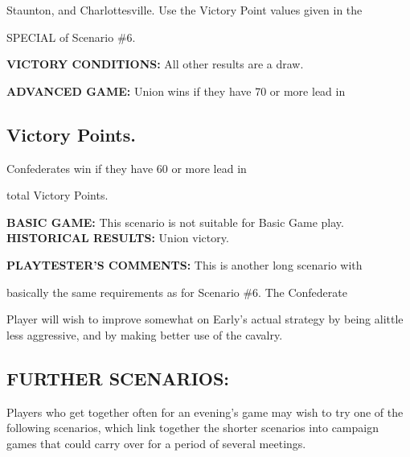 Staunton, and Charlottesville. Use the Victory Point values given in the

\begin{scenariodata}
SPECIAL of Scenario \#6.\\
\end{scenariodata}

\begin{scenariodata}
\textbf{VICTORY CONDITIONS:} All other results are a draw.\\
\end{scenariodata}

\begin{scenariodata}
\textbf{ADVANCED GAME:} Union wins if they have 70 or more lead in\\
\end{scenariodata}

\subsection*{Victory Points.}

\begin{scenariodata}
Confederates win if they have 60 or more lead in\\
\end{scenariodata}

total Victory Points.

\begin{scenariodata}
\textbf{BASIC GAME:} This scenario is not suitable for Basic Game play.\\
\textbf{HISTORICAL RESULTS:} Union victory.\\
\end{scenariodata}

\begin{scenariodata}
\textbf{PLAYTESTER'S COMMENTS:} This is another long scenario with\\
\end{scenariodata}

basically the same requirements as for Scenario \#6. The Confederate

Player will wish to improve somewhat on Early's actual strategy by being alittle less aggressive, and by making better use of the cavalry.

\subsection*{FURTHER SCENARIOS:}

Players who get together often for an evening's game may wish to try one of the following scenarios, which link together the shorter scenarios into campaign games that could carry over for a period of several meetings.

